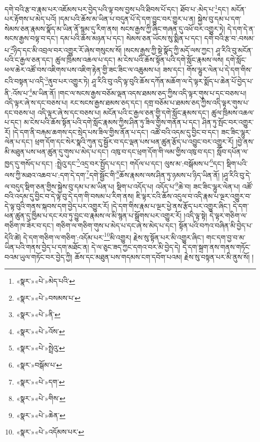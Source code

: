 དགེ་བའི་རྩ་བ་རྣམ་པར་འཇོམས་པར་བྱེད་པའི་ལྟ་བས་བྱས་པའི་ཐིབས་པོ་དང་། ཐོབ་པ་:མེད་པ་\footnote{«སྣར་»«པེ་»མེད་པའི་}དང་། མངོན་པར་རྟོགས་པ་མེད་པའོ། །དམ་པའི་ཆོས་མ་ཡིན་པ་བདུན་པོ་དེ་དག་བྱུང་བར་གྱུར་པ་ན། སྐྱེས་བུ་དམ་པ་དག་སེམས་ཅན་རྣམས་སྣོད་མ་ཡིན་ནོ་སྙམ་དུ་རིག་ནས། སངས་རྒྱས་ཀྱི་ཞིང་གཞན་དུ་འཕོ་བར་འགྱུར་ཏེ། དེ་དག་དེ་ན་སངས་རྒྱས་བལྟ་བ་དང་། དམ་པའི་ཆོས་མཉན་པ་དང་། སེམས་ཅན་ཡོངས་སུ་སྨིན་པ་དང་། དགེ་བའི་རྩ་བ་:བསམ་པ་\footnote{«སྣར་»«པེ་»བསམས་པ་}ཉིད་དང་མི་འབྲལ་བར་འགྱུར་རོ་ཞེས་གསུངས་སོ། །སངས་རྒྱས་ཀྱི་སྡེ་སྣོད་ཀྱི་མདོ་ལས་ཀྱང་། ཤཱ་རིའི་བུ་མངོན་པའི་ང་རྒྱལ་ཅན་དང་། ཚུལ་ཁྲིམས་འཆལ་པ་དང་། མ་ངེས་པའི་ཆོས་སྟོན་པའི་དགེ་སློང་རྣམས་ལས། དགེ་སློང་ཕལ་ཆེར་འཚོ་བས་འཇིགས་པས་འཇིག་རྟེན་གྱི་ཟང་ཟིང་ལ་འཆུམས་པ། ཟས་དང་། གོས་ལྷུར་ལེན་པ་དེ་དག་གིས་ངའི་བསྟན་པ་འདི་\footnote{«སྣར་»«པེ་»ནི་}ནུབ་པར་འགྱུར་ཏེ། ཤཱ་རིའི་བུ་འདི་ལྟ་བུའི་ཆོས་དཀོན་མཆོག་ལ་དེ་ལྟར་སྨོད་པ་ཆེན་པོ་བྱེད་པ་ནི་:འོས་པ་\footnote{«སྣར་»«པེ་»འོས་}མ་ཡིན་ནོ། །གང་ལ་སངས་རྒྱས་བཅོམ་ལྡན་འདས་ཐམས་ཅད་ཀྱིས་འདི་ལྟར་གུས་པ་དང་བཅས་པ། འདི་ལྟར་ཞེ་ས་དང་བཅས་པ། རང་སངས་རྒྱས་ཐམས་ཅད་དང་། དགྲ་བཅོམ་པ་ཐམས་ཅད་ཀྱིས་འདི་ལྟར་གུས་པ་དང་བཅས་པ། འདི་ལྟར་ཞེ་ས་དང་བཅས་པ། མངོན་པའི་ང་རྒྱལ་ཅན་གྱི་དགེ་སློང་རྣམས་དང་། ཚུལ་ཁྲིམས་འཆལ་པ་དང་། མ་ངེས་པའི་ཆོས་སྟོན་པའི་དགེ་སློང་རྣམས་ཀྱིས་ཤིན་ཏུ་ཟིལ་གྱིས་གནོན་པ་དང་། ཤིན་ཏུ་སྤོང་བར་འགྱུར་རོ། །དེ་དག་ནི་བརྐམ་ཆགས་དང་སྲེད་པས་ཟིལ་གྱིས་ནོན་པ་དང་། འཚོ་བའི་འདམ་དུ་བྱིང་བ་དང་། ཟང་ཟིང་ལྷུར་ལེན་པ་དང་། ཕྲག་དོག་དང་སེར་སྣའི་ཀུན་དུ་སྦྱོར་བ་དང་ལྡན་པས་ཕན་ཚུན་རྩོད་པ་འབྱུང་བར་འགྱུར་རོ། །བྱེ་ནས་མི་མཐུན་པས་ཕན་ཚུན་དུ་གུས་པ་མེད་པ་དང་། འཁུ་བ་དང་ཕྲག་དོག་གི་ལམ་གྱིས་འཁུ་བ་དང་། སློབ་དཔོན་ལ་ཁྱད་དུ་གསོད་པ་དང་། :སྤྲེའུ་དང་\footnote{«སྣར་»«པེ་»སྤྲེའུ་}འདྲ་བར་སྤྱོད་པ་དང་། གདོལ་པ་དང་། ལུས་མ་:བསྒོམས་པ་\footnote{«སྣར་»བསྒོམ་པ་}དང་། སྡིག་པའི་ལས་ཀྱི་མཐའ་འཆབ་པ་:དག་དེ་དག་\footnote{«སྣར་»«པེ་»དག་}དགེ་སྦྱོང་གི་\footnote{«སྣར་»«པེ་»གིས་}ཆོས་རྣམས་ལས་ཤིན་ཏུ་ཉམས་པ་ཉིད་ཡིན་ནོ། །ཤཱ་རིའི་བུ་དེ་ལ་བདུད་སྡིག་ཅན་གྱིས་སྐྱེས་བུ་དམ་པ་མ་ཡིན་པ། སྡིག་པ་འདོད་པ། འདོད་པ་\footnote{«སྣར་»«པེ་»ཆེན་}ཆེ་བ། ཟང་ཟིང་ལྷུར་ལེན་པ། འཚོ་བའི་འདམ་དུ་བྱིང་བ་དེ་ལྟ་བུ་དེ་དག་གི་བསམ་པ་རིག་ནས། ཇི་ལྟར་ངའི་ཆོས་འདུལ་བ་འདི་རྣམ་པ་ལྔར་འགྱུར་བ་དེ་ལྟ་བུའི་གནས་སྐབས་དག་བྱེད་པར་འགྱུར་རོ། །དེ་དག་གིས་རྣམ་པ་ལྔར་ཕྱེ་ནས་རྩོད་པར་འགྱུར་ཞིང་། དེ་དག་ཕན་ཚུན་དུ་ཁྱིམ་པ་དང་རབ་ཏུ་བྱུང་བ་རྣམས་ལ་མི་སྙན་པ་སྒྲོགས་པར་འགྱུར་རོ། །འདི་ལྟ་སྟེ། དེ་ལྟར་གཅིག་ལ་གཅིག་ཁ་ཟེར་བ་དང་། གཅིག་ལ་གཅིག་གུས་པ་མེད་པ་དང་ཞེ་ས་མེད་པ་དང་། སྟོན་པའི་བཀའ་བཞིན་མི་བྱེད་པ་དེའི་ཚེ། དེ་དག་གཅིག་ལ་གཅིག་:འདོམ་པར་\footnote{«སྣར་»«པེ་»འདོམས་པར་}མི་འགྱུར། རྗེས་སུ་སྟོན་པར་མི་འགྱུར་ཞིང་། གང་དག་བྱ་བ་མ་ཡིན་པའི་གནས་བྱེད་པ་དག་མཐོང་ན། དེ་ལ་ཅུང་ཟད་ཀྱང་དགའ་བར་མི་བྱེད་དེ། དེ་དག་སྐྲག་ནས་གནས་གཏོང་བའམ་ཡུལ་གཏོང་བར་བྱེད་ཀྱི། ཆོས་དང་མཐུན་པས་གདམས་ངག་དབོག་པའམ། རྗེས་སུ་བསྟན་པར་མི་ནུས་སོ། །
